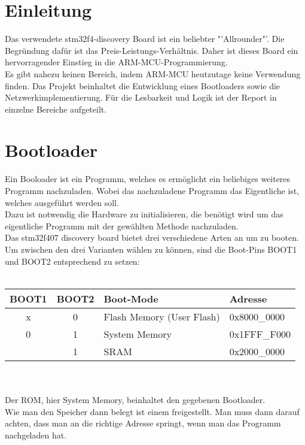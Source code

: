 \chapter{Einleitung}
Das verwendete stm32f4-discovery Board ist ein beliebter "'Allrounder"'.
Die Begr\"undung daf\"ur ist das Preis-Leistungs-Verh\"altnis.
Daher ist dieses Board ein hervorragender Einstieg in die ARM-MCU-Programmierung. \\
Es gibt nahezu keinen Bereich, indem ARM-MCU heutzutage keine Verwendung finden. 
Das Projekt beinhaltet die Entwicklung eines Bootloaders sowie die Netzwerkimplementierung.
F\"ur die Lesbarkeit und Logik ist der Report in einzelne Bereiche aufgeteilt.

\chapter{Bootloader}
Ein Booloader ist ein Programm, welches es erm\"oglicht ein beliebiges weiteres
 Programm nachzuladen. Wobei das nachzuladene Programm das Eigentliche ist, 
welches ausgef\"uhrt werden soll.\\
Dazu ist notwendig die Hardware zu initialisieren, die ben\"otigt wird um das
 eigentliche Programm mit der gew\"ahlten Methode nachzuladen.\\
Das stm32f407 discovery board bietet drei verschiedene Arten an um zu booten.\\
Um zwischen den drei Varianten w\"ahlen zu k\"onnen, sind die Boot-Pins BOOT1
und BOOT2 entsprechend zu setzen:\\\\
\begin{tabular}{|c|c|l|l|}
\hline \hline
  BOOT1 & BOOT2 & Boot-Mode & Adresse\\ \hline
  x & 0 & Flash Memory (User Flash) & 0x8000\_0000\\
\hline
  0 & 1 & System Memory & 0x1FFF\_F000\\
\hline
   & 1 & SRAM & 0x2000\_0000\\
\hline
\end{tabular}\\\\
Der ROM, hier System Memory, beinhaltet den gegebenen Bootloader.\\
Wie man den Speicher dann belegt ist einem freigestellt. Man muss dann darauf
achten, dass man an die richtige Adresse springt, wenn man das Programm nachgeladen
hat.

